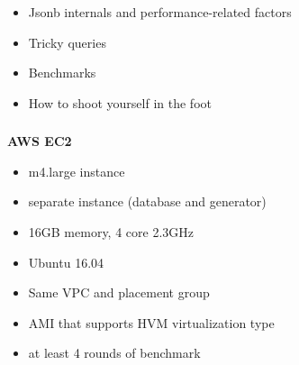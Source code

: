 \documentclass[usenames,dvipsnames, 18pt, compress, aspectratio=169]{beamer}
\begin{document}
\begin{frame}
    \frametitle{}
    \begin{center}
        \pause
        \begin{itemize}[label={\MVRightarrow}]
            \item <+-> Jsonb internals and performance-related factors
            \item <+-> Tricky queries
            \item <+-> Benchmarks
            \item <+-> How to shoot yourself in the foot
        \end{itemize}
    \end{center}
\end{frame}

%
\begin{frame}
    \frametitle{}
\end{frame}


\begin{frame}
    \frametitle{}
    \begin{center}
        \textbf{AWS EC2}
        \begin{itemize}[label={}]
            \item m4.large instance
            \item separate instance (database and generator)
            \item 16GB memory, 4 core 2.3GHz
            \item Ubuntu 16.04
            \item Same VPC and placement group
            \item AMI that supports HVM virtualization type
            \item at least 4 rounds of benchmark
        \end{itemize}
    \end{center}
\end{frame}
\end{document}
